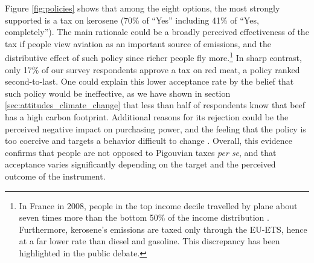 \documentclass[english,5p,authoryear]{elsarticle}
\begin{document}
Figure \ref{fig:policies} shows that among the eight options, the most strongly supported is a tax on kerosene (70\% of ``Yes'' including 41\% of ``Yes, completely''). The main rationale could be a broadly perceived effectiveness of the tax if people view aviation as an important source of emissions, and the distributive effect of such policy since richer people fly more.\footnote{In France in 2008, people in the top income decile travelled by plane about seven times more than the bottom 50\% of the income distribution \citep{pappalardo_mobilite_2010}. Furthermore, kerosene's emissions are taxed only through the EU-ETS, hence at a far lower rate than diesel and gasoline. This discrepancy has been highlighted in the public debate.} In sharp contrast, only 17\% of our survey respondents approve a tax on red meat, a policy ranked second-to-last. One could explain this lower acceptance rate by the belief that such policy would be ineffective, as we have shown in section \ref{sec:attitudes_climate_change} that less than half of respondents know that beef has a high carbon footprint. Additional reasons for its rejection could be the perceived negative impact on purchasing power, and the feeling that the policy is too coercive and targets a behavior difficult to change \citep{de_groot_schuitema_2012}. Overall, this evidence confirms that people are not opposed to Pigouvian taxes \textit{per se}, and that acceptance varies significantly depending on the target and the perceived outcome of the instrument.
\end{document}
